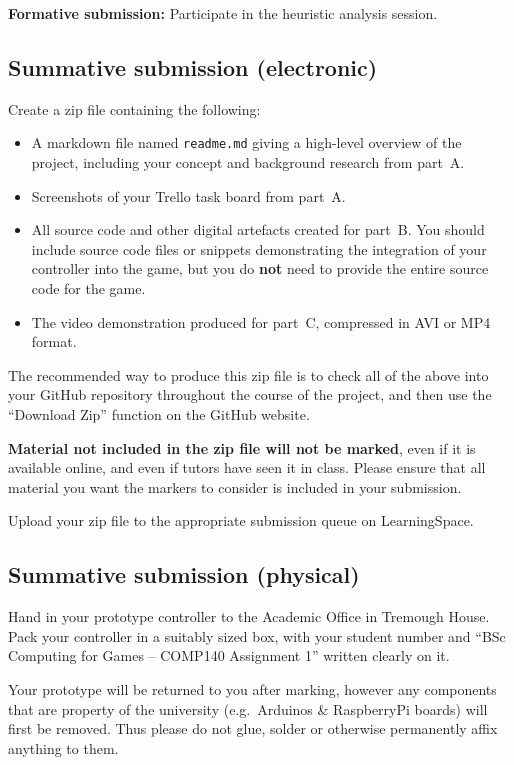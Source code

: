 \documentclass{../fal_assignment}
\begin{document}
\textbf{Formative submission:} Participate in the heuristic analysis session.

\subsection*{Summative submission (electronic)}

Create a zip file containing the following:

\begin{itemize}
\item A markdown file named \texttt{readme.md} giving a high-level overview of the project,
    including your concept and background research from part~A.
\item Screenshots of your Trello task board from part~A.
\item All source code and other digital artefacts created for part~B.
    You should include source code files or snippets demonstrating the integration of your controller into the game,
    but you do \textbf{not} need to provide the entire source code for the game.
\item The video demonstration produced for part~C, compressed in AVI or MP4 format.
\end{itemize}

The recommended way to produce this zip file is to check all of the above into your GitHub repository
throughout the course of the project,
and then use the ``Download Zip'' function on the GitHub website.

\textbf{Material not included in the zip file will not be marked},
even if it is available online, and even if tutors have seen it in class.
Please ensure that all material you want the markers to consider is included in your submission.

Upload your zip file to the appropriate submission queue on LearningSpace.

\subsection*{Summative submission (physical)}

Hand in your prototype controller to the Academic Office in Tremough House.
Pack your controller in a suitably sized box, with your student number
and ``BSc Computing for Games -- COMP140 Assignment 1'' written clearly on it.

Your prototype will be returned to you after marking,
however any components that are property of the university (e.g.\ Arduinos \& RaspberryPi boards)
will first be removed.
Thus please do not glue, solder or otherwise permanently affix anything to them.
\end{document}
